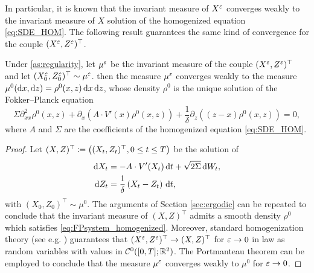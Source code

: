 \documentclass[review,onefignum,onetabnum]{siamonline190516}
\begin{document}
 In particular, it is known that the invariant measure of $X^\varepsilon$ converges weakly to the invariant measure of $X$ solution of the homogenized equation \eqref{eq:SDE_HOM}. The following result guarantees the same kind of convergence for the couple $(X^\varepsilon, Z^\varepsilon)^\top$.

\begin{lemma}\label{lem:convMeasure} Under \cref{as:regularity}, let $\mu^\varepsilon$ be the invariant measure of the couple $(X^\varepsilon, Z^\varepsilon)^\top$ and let $(X_0^\varepsilon, Z_0^\varepsilon)^\top \sim \mu^\varepsilon$.  then the measure $\mu^\varepsilon$ converges weakly to the measure $\mu^0(\mathrm{d} x, \mathrm{d} z) = \rho^0(x, z) \,\mathrm{d} x \,\mathrm{d} z$, whose density $\rho^0$ is the unique solution of the Fokker--Planck equation
\begin{equation} \label{eq:FPsystem_homogenized}
	\Sigma \partial^2_{xx} \rho^0(x,z) + \partial_x\left( A \cdot V'(x) \rho^0(x,z) \right) + \frac{1}{\delta}\partial_z\left((z - x) \rho^0(x,z) \right) = 0,
\end{equation}
where $A$ and $\Sigma$ are the coefficients of the homogenized equation \eqref{eq:SDE_HOM}.
\end{lemma}

\begin{proof} Let $(X, Z)^\top \coloneqq \left((X_t, Z_t)^\top, 0\leq t \leq T\right)$ be the solution of
	\begin{equation}
	\label{eq:systemSDEHom}
	\begin{aligned}
	\d X_t &= -A \cdot V'(X_t) \dd t + \sqrt{2\Sigma} \dd W_t, \\
	\d Z_t &= \frac{1}{\delta} \left ( X_t - Z_t \right ) \dd t,
	\end{aligned}
	\end{equation} 
	with $(X_0, Z_0)^\top \sim \mu^0$. The arguments of Section \ref{sec:ergodic} can be repeated to conclude that the invariant measure of $(X, Z)^\top$ admits a smooth density $\rho^0$ which satisfies \eqref{eq:FPsystem_homogenized}. Moreover, standard homogenization theory (see e.g. \cite[Chapter 3]{BLP78}) guarantees that $(X^\varepsilon,Z^\varepsilon)^\top \to (X,Z)^\top$ for $\varepsilon \to 0$ in law as random variables with values in $\mathcal C^0([0, T]; \mathbb{R}^2)$. The Portmanteau theorem can be employed to conclude that the measure $\mu^\varepsilon$ converges weakly to $\mu^0$ for $\varepsilon \to 0$.
\end{proof}
\end{document}
